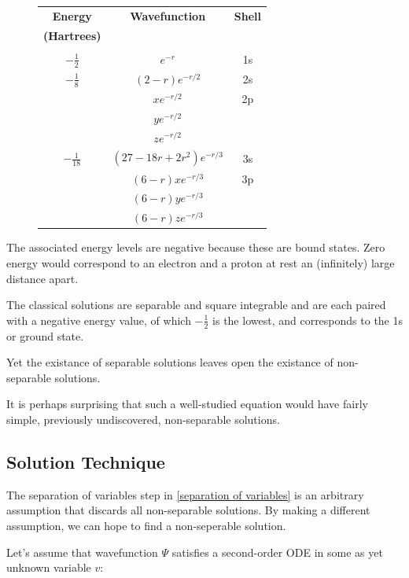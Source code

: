 \documentclass{article}
\begin{document}
\begin{figure}
\begin{center}
\begin{tabular}{ccc}
{\bf Energy}		& {\bf Wavefunction}		& {\bf Shell} \\
{\bf (Hartrees)}	& & \\
\\
$-\frac{1}{2}$		& $e^{-r}$			& 1s \\
$-\frac{1}{8}$		& $(2-r)e^{-r/2}$		& 2s \\
			& $xe^{-r/2}$			& 2p \\
			& $ye^{-r/2}$			\\
			& $ze^{-r/2}$			\\
$-\frac{1}{18}$		& $(27-18r+2r^2)e^{-r/3}$	& 3s \\
			& $(6-r)xe^{-r/3}$		& 3p \\
			& $(6-r)ye^{-r/3}$		\\
			& $(6-r)ze^{-r/3}$		\\
\end{tabular}
\end{center}
\end{figure}

The associated energy levels are negative because these are bound states.  Zero energy
would correspond to an electron and a proton at rest an (infinitely) large distance apart.

The classical solutions are separable and square integrable
and are each paired with a negative energy value, of which $-\frac{1}{2}$ is the lowest,
and corresponds to the 1s or ground state.

Yet the existance of separable solutions leaves open the existance of non-separable solutions.

It is perhaps surprising that such a well-studied equation would have fairly simple, previously
undiscovered, non-separable solutions.

\subsection*{Solution Technique}

The separation of variables step in \eqref{separation of variables} is an arbitrary assumption
that discards all non-separable solutions.  By making a different assumption, we can
hope to find a non-seperable solution.

Let's assume that wavefunction $\Psi$ satisfies a second-order ODE in some as yet unknown variable $v$:
\end{document}
